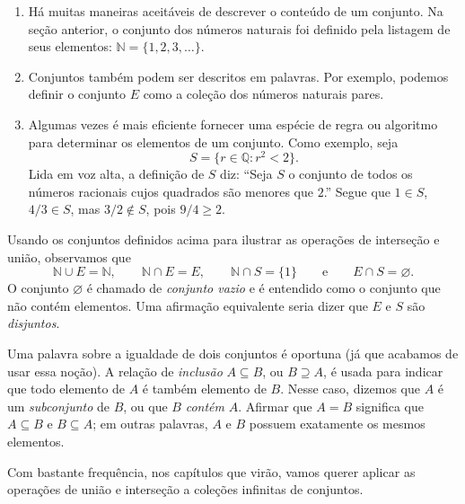 \begin{example}\label{ex:formas-descrever-conjuntos}
\hfill
\begin{enumerate}[label=(\roman*)]
\item Há muitas maneiras aceitáveis de descrever o conteúdo de um conjunto. Na seção anterior, o conjunto dos números naturais foi definido pela listagem de seus elementos: $\mathbb{N} = \{1, 2, 3, \ldots\}$.

\item Conjuntos também podem ser descritos em palavras. Por exemplo, podemos definir o conjunto $E$ como a coleção dos números naturais pares.

\item Algumas vezes é mais eficiente fornecer uma espécie de regra ou algoritmo para determinar os elementos de um conjunto. Como exemplo, seja
\[
S = \{r \in \mathbb{Q} : r^{2} < 2\}.
\]
Lida em voz alta, a definição de $S$ diz: ``Seja $S$ o conjunto de todos os números racionais cujos quadrados são menores que $2$.'' Segue que $1 \in S$, $4/3 \in S$, mas $3/2 \notin S$, pois $9/4 \geq 2$.
\end{enumerate}

Usando os conjuntos definidos acima para ilustrar as operações de interseção e união, observamos que
\[
\mathbb{N} \cup E = \mathbb{N}, \qquad \mathbb{N} \cap E = E, \qquad \mathbb{N} \cap S = \{1\} \qquad \text{e} \qquad E \cap S = \varnothing.
\]
O conjunto $\varnothing$ é chamado de \textit{conjunto vazio} e é entendido como o conjunto que não contém elementos. Uma afirmação equivalente seria dizer que $E$ e $S$ são \textit{disjuntos}.
\end{example}

Uma palavra sobre a igualdade de dois conjuntos é oportuna (já que acabamos de usar essa noção). A relação de \textit{inclusão} $A \subseteq B$, ou $B \supseteq A$, é usada para indicar que todo elemento de $A$ é também elemento de $B$. Nesse caso, dizemos que $A$ é um \textit{subconjunto} de $B$, ou que $B$ \textit{contém} $A$. Afirmar que $A = B$ significa que $A \subseteq B$ e $B \subseteq A$; em outras palavras, $A$ e $B$ possuem exatamente os mesmos elementos.  

Com bastante frequência, nos capítulos que virão, vamos querer aplicar as operações de união e interseção a coleções infinitas de conjuntos.


